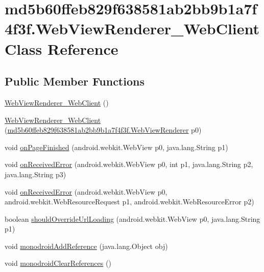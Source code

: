 \hypertarget{classmd5b60ffeb829f638581ab2bb9b1a7f4f3f_1_1_web_view_renderer___web_client}{
\section{md5b60ffeb829f638581ab2bb9b1a7f4f3f.WebViewRenderer\_\-WebClient Class Reference}
\label{classmd5b60ffeb829f638581ab2bb9b1a7f4f3f_1_1_web_view_renderer___web_client}
}
\subsection*{Public Member Functions}
\begin{CompactItemize}
\item 
\hyperlink{classmd5b60ffeb829f638581ab2bb9b1a7f4f3f_1_1_web_view_renderer___web_client_048a9ab015c030dbda36941aebec8453}{WebViewRenderer\_\-WebClient} ()
\item 
\hyperlink{classmd5b60ffeb829f638581ab2bb9b1a7f4f3f_1_1_web_view_renderer___web_client_33a9cb674329cd918c4039658a2f3d84}{WebViewRenderer\_\-WebClient} (\hyperlink{classmd5b60ffeb829f638581ab2bb9b1a7f4f3f_1_1_web_view_renderer}{md5b60ffeb829f638581ab2bb9b1a7f4f3f.WebViewRenderer} p0)
\item 
void \hyperlink{classmd5b60ffeb829f638581ab2bb9b1a7f4f3f_1_1_web_view_renderer___web_client_b063610e154fb263a1a28d889d535cfe}{onPageFinished} (android.webkit.WebView p0, java.lang.String p1)
\item 
void \hyperlink{classmd5b60ffeb829f638581ab2bb9b1a7f4f3f_1_1_web_view_renderer___web_client_3e92fd41a7e068430df1b5280e3e138a}{onReceivedError} (android.webkit.WebView p0, int p1, java.lang.String p2, java.lang.String p3)
\item 
void \hyperlink{classmd5b60ffeb829f638581ab2bb9b1a7f4f3f_1_1_web_view_renderer___web_client_62578f73914345150ae2e2dd574e703b}{onReceivedError} (android.webkit.WebView p0, android.webkit.WebResourceRequest p1, android.webkit.WebResourceError p2)
\item 
boolean \hyperlink{classmd5b60ffeb829f638581ab2bb9b1a7f4f3f_1_1_web_view_renderer___web_client_56f79eb769429d223e2db82caeaa506e}{shouldOverrideUrlLoading} (android.webkit.WebView p0, java.lang.String p1)
\item 
void \hyperlink{classmd5b60ffeb829f638581ab2bb9b1a7f4f3f_1_1_web_view_renderer___web_client_3143e24d6cac64ffe8d112f95fea6ebb}{monodroidAddReference} (java.lang.Object obj)
\item 
void \hyperlink{classmd5b60ffeb829f638581ab2bb9b1a7f4f3f_1_1_web_view_renderer___web_client_75eb82e6db7f723093a7ea63eda54cd2}{monodroidClearReferences} ()
\end{CompactItemize}
